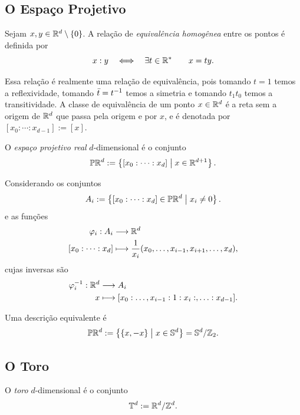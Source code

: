 \subsection{O Espaço Projetivo}

\begin{defi}
Sejam $x,y \in \mathbb{R}^d\setminus\{0\}$. A relação de \emph{equivalência homogênea} entre os pontos é definida por
	\begin{equation*}
	x : y \quad \Longleftrightarrow \quad \exists t \in \mathbb{R}^* \qquad x = ty.
	\end{equation*}
\end{defi}

Essa relação é realmente uma relação de equivalência, pois tomando $t=1$ temos a reflexividade, tomando $\bar t = t^{-1}$ temos a simetria e tomando $t_1t_0$ temos a transitividade. A classe de equivalência de um ponto $x \in \mathbb{R}^d$ é a reta sem a origem de $\mathbb{R}^d$ que passa pela origem e por $x$, e é denotada por $[x_0 : \cdots : x_{d-1}] := [x]$.

\begin{defi}
O \emph{espaço projetivo real} $d$-dimensional é o conjunto
	\begin{equation*}
	\mathbb{P}\mathbb{R}^d := \left\{[x_0 : \cdots : x_d] \;\middle\vert\; x \in \mathbb{R}^{d+1} \right\}.
	\end{equation*}
\end{defi}

Considerando os conjuntos
	\begin{equation*}
	A_i := \left\{[x_0 : \cdots : x_d] \in \mathbb{P}\mathbb{R}^d \;\middle\vert\; x_i \neq 0 \right\}.
	\end{equation*}
e as funções
	\begin{align*}
	{\varphi_i}: {A_i} &\longrightarrow {\mathbb{R}^d} \\{[x_0 : \cdots : x_d]} &\longmapsto {\frac{1}{x_i}(x_0,\ldots,x_{i-1},x_{i+1},\ldots,x_d)},
	\end{align*}
cujas inversas são
	\begin{align*}
	{\varphi_i^{-1}}: {\mathbb{R}^d} &\longrightarrow {A_i} \\{x} &\longmapsto {[x_0:\ldots,x_{i-1}:1:x_i:,\ldots:x_{d-1}]}.
	\end{align*}

Uma descrição equivalente é
	\begin{equation*}
	\mathbb{P}\mathbb{R}^d := \left\{\{x,-x\} \;\middle\vert\; x \in \mathbb{S}^d \right\} = \mathbb{S}^d/\mathbb{Z}_2.
	\end{equation*}

\subsection{O Toro}

\begin{defi}
	O \emph{toro} $d$-dimensional é o conjunto
	\begin{equation*}
	\mathbb{T}^d := \mathbb{R}^d / \mathbb{Z}^d.
	\end{equation*}
\end{defi}


